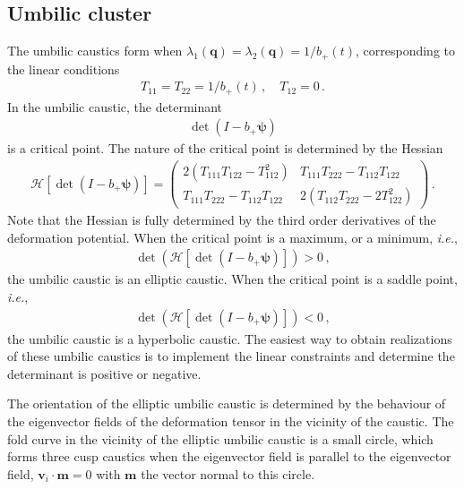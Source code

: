 \documentclass[a4paper, 11pt]{article}
\begin{document}
\subsection{Umbilic cluster}
The umbilic caustics form when $\lambda_1(\bm{q}) = \lambda_2(\bm{q}) = 1/b_+(t)$, corresponding to the linear conditions
\begin{align}
T_{11}=T_{22}=1/b_+(t)\,, \quad T_{12}=0\,.
\end{align}
In the umbilic caustic, the determinant 
\begin{align}
\det (I- b_+ \bm{\psi})
\end{align}
is a critical point. The nature of the critical point is determined by the Hessian
\begin{align}
\mathcal{H}\left[\det (I- b_+ \bm{\psi})\right] =
\begin{pmatrix} 
2(T_{111}T_{122} -T_{112}^2) & T_{111}T_{222}-T_{112}T_{122} \\
T_{111}T_{222}-T_{112}T_{122} & 2(T_{112}T_{222}-2T_{122}^2)
\end{pmatrix}\,.
\end{align}
Note that the Hessian is fully determined by the third order derivatives of the deformation potential. When the critical point is a maximum, or a minimum, \textit{i.e.},
\begin{align}
\det (\mathcal{H}\left[\det (I- b_+ \bm{\psi})\right]) >0\,,
\end{align}
the umbilic caustic is an elliptic caustic. When the critical point is a saddle point, \textit{i.e.},
\begin{align}
\det (\mathcal{H}\left[\det (I- b_+ \bm{\psi})\right]) <0\,,
\end{align}
the umbilic caustic is a hyperbolic caustic. The easiest way to obtain realizations of these umbilic caustics is to implement the linear constraints and determine the determinant is positive or negative.

The orientation of the elliptic umbilic caustic is determined by the behaviour of the eigenvector fields of the deformation tensor in the vicinity of the caustic. The fold curve in the vicinity of the elliptic umbilic caustic is a small circle, which forms three cusp caustics when the eigenvector field is parallel to the eigenvector field, $\bm{v}_i \cdot \bm{m} = 0$ with $\bm{m}$ the vector normal to this circle.
\end{document}
